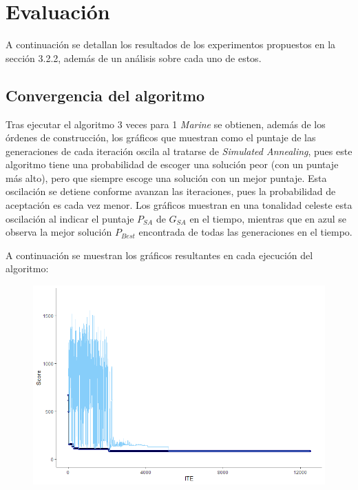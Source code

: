 \section{Evaluación}

A continuación se detallan los resultados de los experimentos propuestos en la sección 3.2.2, además de un análisis sobre cada uno de estos.

\subsection{Convergencia del algoritmo}

Tras ejecutar el algoritmo 3 veces para 1 \textit{Marine} se obtienen, además de los órdenes de construcción, los gráficos que muestran como el puntaje de las generaciones de cada iteración oscila al tratarse de \textit{Simulated Annealing}, pues este algoritmo tiene una probabilidad de escoger una solución peor (con un puntaje más alto), pero que siempre escoge una solución con un mejor puntaje. Esta oscilación se detiene conforme avanzan las iteraciones, pues la probabilidad de aceptación es cada vez menor. Los gráficos muestran en una tonalidad celeste esta oscilación al indicar el puntaje $P_{SA}$ de $G_{SA}$ en el tiempo, mientras que en azul se observa la mejor solución $P_{Best}$ encontrada de todas las generaciones en el tiempo.

A continuación se muestran los gráficos resultantes en cada ejecución del algoritmo:

\begin{figure}[H]
	\centering
	\captionsetup{justification=centering}
	\includegraphics[scale=0.65]{images/marine1.png}
	\label{fig:10}
\end{figure}

